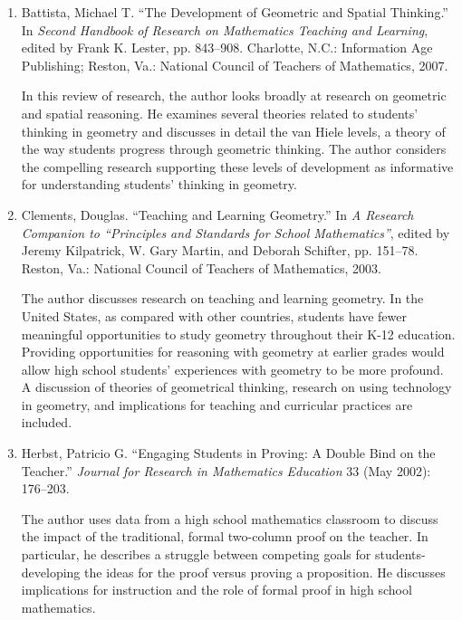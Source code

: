 \documentclass[
  10pt,
  a4paper,
  landscape,
  twoside,
  openany
]{scrbook}
\newcommand{\EN}[1]{#1}
\begin{document}
\TriPara
{
\EN{
  \begin{enumerate}
    \item Battista, Michael T. ``The Development of Geometric and Spatial Thinking.'' In \emph{Second Handbook of Research on Mathematics Teaching and Learning}, edited by Frank K. Lester, pp. 843--908. Charlotte, N.C.: Information Age Publishing; Reston, Va.: National Council of Teachers of Mathematics, 2007.

      In this review of research, the author looks broadly at research on geometric and spatial reasoning. He examines several theories related to students' thinking in geometry and discusses in detail the van Hiele levels, a theory of the way students progress through geometric thinking. The author considers the compelling research supporting these levels of development as informative for understanding students' thinking in geometry.

    \item Clements, Douglas. ``Teaching and Learning Geometry.'' In \emph{A Research Companion to ``Principles and Standards for School Mathematics''}, edited by Jeremy Kilpatrick, W. Gary Martin, and Deborah Schifter, pp. 151--78. Reston, Va.: National Council of Teachers of Mathematics, 2003.

      The author discusses research on teaching and learning geometry. In the United States, as compared with other countries, students have fewer meaningful opportunities to study geometry throughout their K-12 education. Providing opportunities for reasoning with geometry at earlier grades would allow high school students' experiences with geometry to be more profound. A discussion of theories of geometrical thinking, research on using technology in geometry, and implications for teaching and curricular practices are included.
    
    \item Herbst, Patricio G. ``Engaging Students in Proving: A Double Bind on the Teacher.'' \emph{Journal for Research in Mathematics Education} 33 (May 2002): 176--203.

      The author uses data from a high school mathematics classroom to discuss the impact of the traditional, formal two-column proof on the teacher. In particular, he describes a struggle between competing goals for students-developing the ideas for the proof versus proving a proposition. He discusses implications for instruction and the role of formal proof in high school mathematics.
  \end{enumerate}}
}
\end{document}
